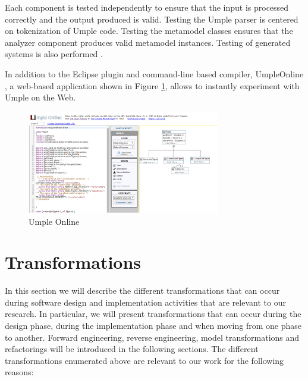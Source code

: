Each component is tested independently to ensure that the input is processed correctly and the output produced is valid. Testing the Umple parser is centered on tokenization of Umple code. Testing the metamodel classes ensures that the analyzer component produces valid metamodel instances. Testing of generated systems is also performed \cite{umpleTesting2014}.


In addition to the Eclipse plugin and command-line based compiler, UmpleOnline \cite{UmpleOnline}, a web-based application shown in Figure \ref{fig:uonline}, allows to instantly experiment with Umple on the Web. 

\begin{figure}[h]
\centering
\includegraphics[width=0.75\textwidth]{Figures/uonline.png} 
\caption{Umple Online}
\label{fig:uonline}
\end{figure}

\section{Transformations}

In this section we will describe the different transformations that can occur during software design and implementation activities that are relevant to our research. In particular, we will present transformations that can occur during the design phase, during the implementation phase and when moving from one phase to another. Forward engineering, reverse engineering, model transformations and refactorings will be introduced in the following sections. The different transformations enumerated above are relevant to our work for the following reasons: 

